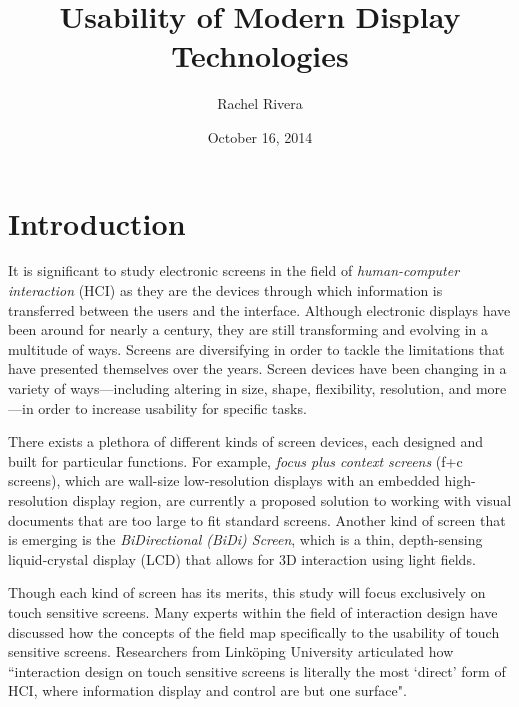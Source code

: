 \documentclass{article}
\title{Usability of Modern Display Technologies}
\author{Rachel Rivera}
\date{October 16, 2014}
\begin{document}
\maketitle


\pagebreak
\tableofcontents


\pagebreak

%
%
\section{Introduction}
\label{introduction}

It is significant to study electronic screens in the field of \textit{human-computer interaction} (HCI) as they are the devices through which information is transferred between the users and the interface. Although electronic displays have been around for nearly a century, they are still transforming and evolving in a multitude of ways. Screens are diversifying in order to tackle  the limitations that have presented themselves over the years. Screen devices have been changing in a variety of ways---including altering in size, shape, flexibility, resolution, and more---in order to increase usability for specific tasks. 

There exists a plethora of different kinds of screen devices, each designed and built for particular functions. For example, \textit{focus plus context screens} (f+c screens), which are wall-size low-resolution displays with an embedded high-resolution display region, are currently a proposed solution to working with visual documents that are too large to fit standard screens.\cite{Baudisch:2002:FPC:506443.506445} Another kind of screen that is emerging is the \textit{BiDirectional (BiDi) Screen}, which is a thin, depth-sensing liquid-crystal display (LCD) that allows for 3D interaction using light fields.\cite{Hirsch:2009:BST:1618452.1618505}

 Though each kind of screen has its merits, this study will focus exclusively on touch sensitive screens. Many experts within the field of interaction design have discussed how the concepts of the field map specifically to the usability of touch sensitive screens. Researchers from Linköping University articulated how ``interaction design on touch sensitive screens is literally the most `direct' form of HCI, where information display and control are but one surface".\cite{Albinsson:2003:HPT:642611.642631}
\end{document}
